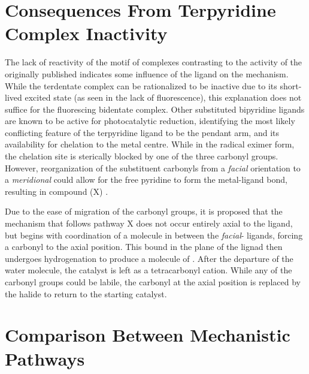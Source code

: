 \section{Consequences From \texorpdfstring{}{Bidentate} Terpyridine Complex Inactivity}

The lack of reactivity of the  motif of complexes contrasting to the activity of the originally published  indicates some influence of the ligand on the mechanism. While the terdentate complex can be rationalized to be inactive due to its short-lived excited state (as seen in the lack of fluorescence), this explanation does not suffice for the fluorescing bidentate complex. Other substituted bipyridine ligands are known to be active for photocatalytic reduction, identifying the most likely conflicting feature of the terpyridine ligand to be the pendant arm, and its availability for chelation to the metal centre. While in the radical eximer form, the chelation site is sterically blocked by one of the three carbonyl groups. However, reorganization of the substituent carbonyls from a \textit{facial} orientation to a \textit{meridional} could allow for the free pyridine to form the metal-ligand bond, resulting in compound (X) . 

Due to the ease of migration of the carbonyl groups, it is proposed that the mechanism that follows pathway X does not occur entirely axial to the ligand, but begins with coordination of a  molecule in between the \textit{facial}- ligands, forcing a carbonyl to the axial position. This  bound in the plane of the lignad then undergoes hydrogenation to produce a molecule of . After the departure of the water molecule, the catalyst is left as a tetracarbonyl cation. While any of the carbonyl groups could be labile, the carbonyl at the axial position is replaced by the halide to return to the starting catalyst. 

\section{Comparison Between Mechanistic Pathways}

